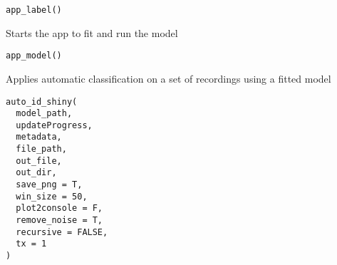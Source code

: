 \documentclass[letterpaper]{book}
\begin{document}
%
\begin{Usage}
\begin{verbatim}
app_label()
\end{verbatim}
\end{Usage}
%
\begin{Description}\relax
Starts the app to fit  and run the model
\end{Description}
%
\begin{Usage}
\begin{verbatim}
app_model()
\end{verbatim}
\end{Usage}
%
\begin{Description}\relax
Applies automatic classification on a set of recordings
using a fitted model
\end{Description}
%
\begin{Usage}
\begin{verbatim}
auto_id_shiny(
  model_path,
  updateProgress,
  metadata,
  file_path,
  out_file,
  out_dir,
  save_png = T,
  win_size = 50,
  plot2console = F,
  remove_noise = T,
  recursive = FALSE,
  tx = 1
)
\end{verbatim}
\end{Usage}
%
\end{document}
